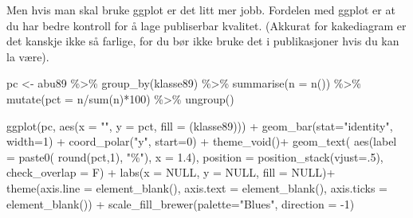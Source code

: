 \documentclass[
  norsk,
  letterpaper,
  DIV=11,
  numbers=noendperiod]{scrreprt}
\newenvironment{Shaded}{\begin{snugshade}}{\end{snugshade}}
\newcommand{\AttributeTok}[1]{\textcolor[rgb]{0.40,0.45,0.13}{#1}}
\newcommand{\ConstantTok}[1]{\textcolor[rgb]{0.56,0.35,0.01}{#1}}
\newcommand{\DecValTok}[1]{\textcolor[rgb]{0.68,0.00,0.00}{#1}}
\newcommand{\FloatTok}[1]{\textcolor[rgb]{0.68,0.00,0.00}{#1}}
\newcommand{\FunctionTok}[1]{\textcolor[rgb]{0.28,0.35,0.67}{#1}}
\newcommand{\NormalTok}[1]{\textcolor[rgb]{0.00,0.23,0.31}{#1}}
\newcommand{\OtherTok}[1]{\textcolor[rgb]{0.00,0.23,0.31}{#1}}
\newcommand{\SpecialCharTok}[1]{\textcolor[rgb]{0.37,0.37,0.37}{#1}}
\newcommand{\StringTok}[1]{\textcolor[rgb]{0.13,0.47,0.30}{#1}}
\theoremstyle{definition}
\theoremstyle{remark}
\begin{document}
Men hvis man skal bruke ggplot er det litt mer jobb. Fordelen med ggplot
er at du har bedre kontroll for å lage publiserbar kvalitet. (Akkurat
for kakediagram er det kanskje ikke så farlige, for du bør ikke bruke
det i publikasjoner hvis du kan la være).

\begin{Shaded}
\begin{Highlighting}[]
\NormalTok{pc }\OtherTok{\textless{}{-}}\NormalTok{ abu89 }\SpecialCharTok{\%\textgreater{}\%} 
  \FunctionTok{group\_by}\NormalTok{(klasse89) }\SpecialCharTok{\%\textgreater{}\%} 
  \FunctionTok{summarise}\NormalTok{(}\AttributeTok{n =} \FunctionTok{n}\NormalTok{()) }\SpecialCharTok{\%\textgreater{}\%} 
  \FunctionTok{mutate}\NormalTok{(}\AttributeTok{pct =}\NormalTok{ n}\SpecialCharTok{/}\FunctionTok{sum}\NormalTok{(n)}\SpecialCharTok{*}\DecValTok{100}\NormalTok{) }\SpecialCharTok{\%\textgreater{}\%} 
  \FunctionTok{ungroup}\NormalTok{()}

\FunctionTok{ggplot}\NormalTok{(pc, }\FunctionTok{aes}\NormalTok{(}\AttributeTok{x =} \StringTok{""}\NormalTok{, }\AttributeTok{y =}\NormalTok{ pct, }\AttributeTok{fill =}\NormalTok{ (klasse89))) }\SpecialCharTok{+}
  \FunctionTok{geom\_bar}\NormalTok{(}\AttributeTok{stat=}\StringTok{"identity"}\NormalTok{, }\AttributeTok{width=}\DecValTok{1}\NormalTok{) }\SpecialCharTok{+}
  \FunctionTok{coord\_polar}\NormalTok{(}\StringTok{"y"}\NormalTok{, }\AttributeTok{start=}\DecValTok{0}\NormalTok{) }\SpecialCharTok{+}
  \FunctionTok{theme\_void}\NormalTok{()}\SpecialCharTok{+}
  \FunctionTok{geom\_text}\NormalTok{( }\FunctionTok{aes}\NormalTok{(}\AttributeTok{label =} \FunctionTok{paste0}\NormalTok{( }\FunctionTok{round}\NormalTok{(pct,}\DecValTok{1}\NormalTok{), }\StringTok{"\%"}\NormalTok{), }\AttributeTok{x =} \FloatTok{1.4}\NormalTok{), }
            \AttributeTok{position =} \FunctionTok{position\_stack}\NormalTok{(}\AttributeTok{vjust=}\NormalTok{.}\DecValTok{5}\NormalTok{), }\AttributeTok{check\_overlap =}\NormalTok{ F) }\SpecialCharTok{+}
  \FunctionTok{labs}\NormalTok{(}\AttributeTok{x =} \ConstantTok{NULL}\NormalTok{, }\AttributeTok{y =} \ConstantTok{NULL}\NormalTok{, }\AttributeTok{fill =} \ConstantTok{NULL}\NormalTok{)}\SpecialCharTok{+}
  \FunctionTok{theme}\NormalTok{(}\AttributeTok{axis.line =} \FunctionTok{element\_blank}\NormalTok{(),}
          \AttributeTok{axis.text =} \FunctionTok{element\_blank}\NormalTok{(),}
          \AttributeTok{axis.ticks =} \FunctionTok{element\_blank}\NormalTok{()) }\SpecialCharTok{+}
  \FunctionTok{scale\_fill\_brewer}\NormalTok{(}\AttributeTok{palette=}\StringTok{"Blues"}\NormalTok{, }\AttributeTok{direction =} \SpecialCharTok{{-}}\DecValTok{1}\NormalTok{)}
\end{Highlighting}
\end{Shaded}
\end{document}
